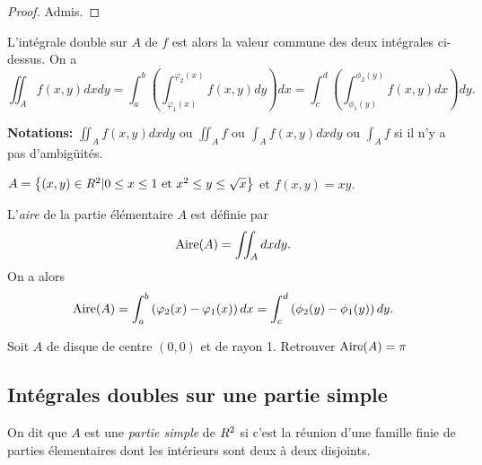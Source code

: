 \begin{proof}
	Admis.
\end{proof}

\begin{definition}
	L'intégrale double sur $A$ de $f$ est alors la valeur commune des deux intégrales ci-dessus. On a 
\[
\iint_A f(x,y) dx dy = 	\int_a^b \left( \int_{\varphi_1(x)}^{\varphi_2(x)} f(x,y) dy \right) dx = \int_{c}^{d}\left( \int_{\phi_1(y) }^{\phi_2(y)} f(x,y) dx \right)dy.
\]
\end{definition}

{\bf\sffamily Notations:} $\iint_A f(x,y) dx dy$ ou $\iint_A f  $ ou $	\int_A f(x,y) dx dy  $ ou $ \int_A f$ si il n'y a pas d'ambigüités.

\begin{exemple}
	$A = \left\{ (x,y) \in R^2 | 0 \leq x \leq 1 \text{ et } x^2 \leq y \leq \sqrt{x} \right\}$ et $f(x,y) = xy$.
	\pl{\rep{8cm}}
\end{exemple}


\begin{defprop}
	L'\emph{aire} de la partie élémentaire $A$ est définie par 
	\[
		\operatorname{Aire}(A) = \iint_A dx dy.
	\]
	On a alors 
	\[
\operatorname{Aire}(A) = \int_a^b \left( \varphi_2(x) - \varphi_1(x) \right) dx = \int_c^d \left( \phi_2(y) - \phi_1(y) \right) dy.
	\]
\end{defprop}

\begin{exemple}
	Soit $A$ de disque de centre $(0,0)$ et de rayon 1. Retrouver $\operatorname{Aire}(A) = \pi$ 
	\pl{\rep{12cm}}
\end{exemple}

\sld{\vfill\pagebreak[5]}%

\subsection{Intégrales doubles sur une partie simple}

\begin{definition}
	On dit que $A$ est une \emph{partie simple} de $R^2$ si c'est la réunion d'une famille finie de parties élementaires dont les intérieurs sont deux à deux disjoints. 
\end{definition}

